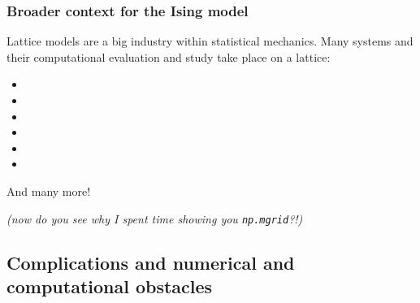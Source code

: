 \documentclass[hyperref={colorlinks=true}]{beamer}
\begin{document}
\begin{frame}%
  \frametitle{Broader context for the Ising model}
  
  Lattice models are a big industry within statistical mechanics. Many systems and their computational evaluation and study take place on a lattice:
  
  \begin{itemize}
    \item {}
    \item {}
    \item {}
    \item {}
    \item {}
    \item {}
  \end{itemize}
  
  And many more!
  
  \center \textit{(now do you see why I spent time showing you \texttt{np.mgrid}?!)}
  
\end{frame}

\subsection[Complications and numerical and computational obstacles]{Complications and numerical and computational obstacles}

\end{document}
